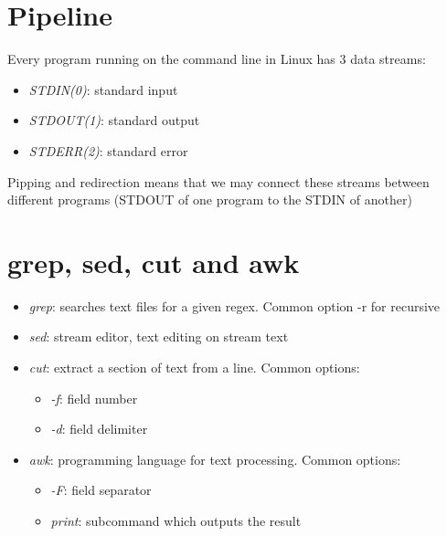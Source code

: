 \documentclass[a4paper,12pts]{article}
\begin{document}
\section{Pipeline}
Every program running on the command line in Linux has 3 data streams:
\begin{itemize}
    \item \textit{STDIN(0)}: standard input
    \item \textit{STDOUT(1)}: standard output
    \item \textit{STDERR(2)}: standard error
\end{itemize}
Pipping and redirection means that we may connect these streams between
different programs (STDOUT of one program to the STDIN of another) 

\section{grep, sed, cut and awk}
\begin{itemize}
    \item \textit{grep}: searches text files for a given regex. Common option -r
        for recursive
    \item \textit{sed}: stream editor, text editing on stream text
    \item \textit{cut}: extract a section of text from a line. Common options:
        \begin{itemize}
            \item \textit{-f}: field number
            \item \textit{-d}: field delimiter
        \end{itemize}
    \item \textit{awk}: programming language for text processing. Common
        options:
        \begin{itemize}
            \item \textit{-F}: field separator
            \item \textit{print}: subcommand which outputs the result
        \end{itemize}
\end{itemize}
\end{document}

